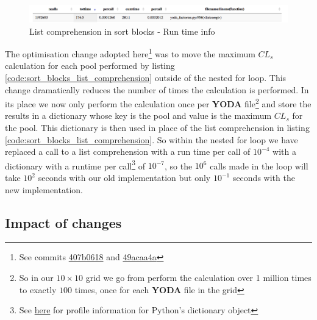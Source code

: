 \begin{figure}[H]
\centering
\includegraphics[scale=0.3]{plots/sort_blocks_list_comprehension.png}
\caption{List comprehension in sort blocks - Run time info}
\label{fig:list_comprehension}
\end{figure}

The optimisation change adopted here\footnote{See commits \href{https://gitlab.com/hepcedar/contur/-/commit/407b0618b8538fe6491a5358b078900e7f01d1e9}{407b0618} and \href{https://gitlab.com/hepcedar/contur/-/commit/49acaa4a340e28aa04ac444e80902a32edd9b630}{49acaa4a}} was to move the maximum $CL_s$ calculation for each pool performed by listing \ref{code:sort_blocks_list_comprehension} outside of the nested for loop. This change dramatically reduces the number of times the calculation is performed. In its place we now only perform the calculation once per \textbf{YODA} file\footnote{So in our $10\times 10$  grid we go from perform the calculation over 1 million times to exactly $100$ times, once for each \textbf{YODA} file in the grid} and store the results in a dictionary whose key is the pool and value is the maximum $CL_s$ for the pool. This dictionary is then used in place of the list comprehension in  listing \ref{code:sort_blocks_list_comprehension}. So within the nested for loop we have replaced a call to a list comprehension with a run time per call of $10^{-4}$ with a dictionary with a runtime per call\footnote{See \href{https://towardsdatascience.com/faster-lookups-in-python-1d7503e9cd38}{here} for profile information for Python's dictionary object} of $10^{-7}$, so the $10^6$ calls made in the loop will take $10^2$ seconds with our old implementation but only $10^{-1}$ seconds with the new implementation.

\subsection{Impact of changes}

